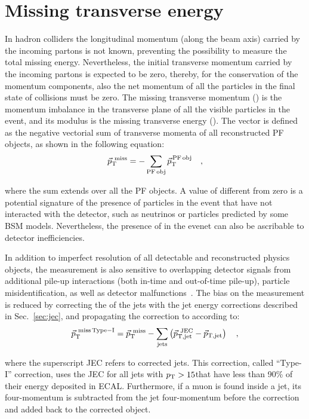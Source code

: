 \section{Missing transverse energy}\label{sec:met}

In hadron colliders the longitudinal momentum (along the beam axis) carried by the incoming partons is not known, preventing the possibility to measure the total missing energy. Nevertheless, the initial transverse momentum carried by the incoming partons is expected to be zero, thereby, for the conservation of the momentum components, also the net momentum of all the particles in the final state of collisions must be zero. The missing transverse momentum (\ptmiss) is the momentum imbalance in the transverse plane of all the visible particles in the event, and its modulus is the missing transverse energy (\MET). The \ptmiss vector is defined as the negative vectorial sum of transverse momenta of all reconstructed PF objects, as shown in the following equation:
\begin{equation}\label{eq:met}
\vec{p}_\mathrm{T}^\mathrm{~miss} = - \sum_{\mathrm{PF\,obj}} \vec{p}_\mathrm{T}^\mathrm{\,PF\,obj} \quad,
\end{equation}

\noindent where the sum extends over all the PF objects.
A value of \MET different from zero is a potential signature of the presence of particles in the event that have not interacted with the detector, such as neutrinos or particles predicted by some BSM models. Nevertheless, the presence of \MET in the evenet can also be ascribable to detector inefficiencies.

In addition to imperfect resolution of all detectable and reconstructed physics objects, the \MET measurement is also sensitive to overlapping detector signals from additional pile-up interactions (both in-time and out-of-time pile-up), particle misidentification, as well as detector  malfunctions~\cite{CMS-PAS-JME-12-002,CMS-PAS-JME-16-004}.
The bias on the \MET measurement is reduced by correcting the \pt of the jets with the jet energy corrections described in Sec.~\ref{sec:jec}, and propagating the correction to \MET according to:
\begin{equation}
\vec{p}_\mathrm{T}^\mathrm{~miss\,Type-I} = \vec{p}_\mathrm{T}^\mathrm{~miss} - \sum_\mathrm{jets} \left( \vec{p}_\mathrm{T,jet}^\mathrm{~JEC} - \vec{p}_\mathrm{T,jet}  \right) \quad ,
\end{equation}

\noindent where the superscript JEC refers to corrected jets. This correction, called ``Type-I'' correction, uses the JEC for all jets with $p_\mathrm{T}>15$\GeV that have less than 90\% of their energy deposited in ECAL. Furthermore, if a muon is found inside a jet, its four-momentum is subtracted from the jet four-momentum before the correction and added back to the corrected object.

